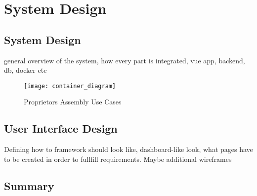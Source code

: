 \chapter[System Design]{System Design}

\section{System Design}
general overview of the system, how every part is integrated, vue app, backend, db, docker etc

\begin{figure}[H]
    \begin{center}
    \texttt{[image: container\_diagram]}
    \end{center}
    \caption{Proprietors Assembly Use Cases}
    \label{fig:usecases}
\end{figure}

\section{User Interface Design}
Defining how to framework should look like, dashboard-like look, what pages have to be created in order to fullfill requirements. Maybe additional wireframes

\section{Summary}